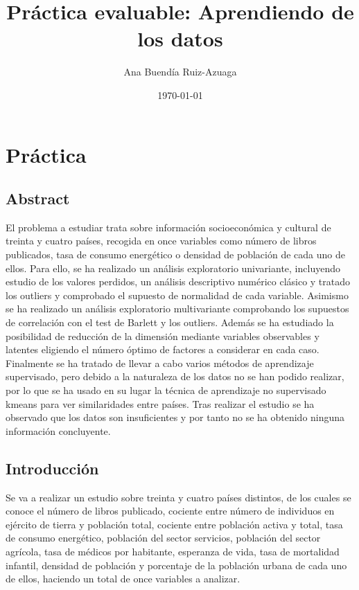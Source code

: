 \documentclass[twoside,openright,titlepage,numbers=noenddot,openany,headinclude,footinclude=true,
cleardoublepage=empty,abstractoff,BCOR=5mm,paper=a4,fontsize=12pt,main=spanish]{scrreprt}
\author{Ana Buendía Ruiz-Azuaga}
\date{\today}
\title{Práctica evaluable: Aprendiendo de los datos}
\begin{document}
\maketitle

\tableofcontents
\newpage

\chapter{Práctica}

\section{Abstract}

El problema a estudiar trata sobre información socioeconómica y cultural de treinta y cuatro países, recogida en once variables como número de libros publicados, tasa de consumo energético o densidad de población de cada uno de ellos. Para ello, se ha realizado un análisis exploratorio univariante, incluyendo estudio de los valores perdidos, un análisis descriptivo numérico clásico y tratado los outliers y comprobado el supuesto de normalidad de cada variable. Asimismo se ha realizado un análisis exploratorio multivariante comprobando los supuestos de correlación con el test de Barlett y los outliers. Además se ha estudiado la posibilidad de reducción de la dimensión mediante variables observables y latentes eligiendo el número óptimo de factores a considerar en cada caso. Finalmente se ha tratado de llevar a cabo varios métodos de aprendizaje supervisado, pero debido a la naturaleza de los datos no se han podido realizar, por lo que se ha usado en su lugar la técnica de aprendizaje no supervisado kmeans para ver similaridades entre países. Tras realizar el estudio se ha observado que los datos son insuficientes y por tanto no se ha obtenido ninguna información concluyente.

\section{Introducción}

Se va a realizar un estudio sobre treinta y cuatro países distintos, de los cuales se conoce el número de libros publicado, cociente entre número de individuos en ejército de tierra y población total, cociente entre población activa y total, tasa de consumo energético, población del sector servicios, población del sector agrícola, tasa de médicos por habitante, esperanza de vida, tasa de mortalidad infantil, densidad de población y porcentaje de la población urbana de cada uno de ellos, haciendo un total de once variables a analizar.
\end{document}
